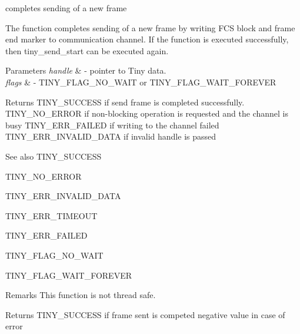 completes sending of a new frame 

The function completes sending of a new frame by writing F\+C\+S block and frame end marker to communication channel. If the function is executed successfully, then tiny\+\_\+send\+\_\+start can be executed again.


\begin{DoxyParams}{Parameters}
{\em handle} & -\/ pointer to Tiny data. \\
\hline
{\em flags} & -\/ T\+I\+N\+Y\+\_\+\+F\+L\+A\+G\+\_\+\+N\+O\+\_\+\+W\+A\+I\+T or T\+I\+N\+Y\+\_\+\+F\+L\+A\+G\+\_\+\+W\+A\+I\+T\+\_\+\+F\+O\+R\+E\+V\+E\+R \\
\hline
\end{DoxyParams}
\begin{DoxyReturn}{Returns}
T\+I\+N\+Y\+\_\+\+S\+U\+C\+C\+E\+S\+S if send frame is completed successfully. T\+I\+N\+Y\+\_\+\+N\+O\+\_\+\+E\+R\+R\+O\+R if non-\/blocking operation is requested and the channel is busy T\+I\+N\+Y\+\_\+\+E\+R\+R\+\_\+\+F\+A\+I\+L\+E\+D if writing to the channel failed T\+I\+N\+Y\+\_\+\+E\+R\+R\+\_\+\+I\+N\+V\+A\+L\+I\+D\+\_\+\+D\+A\+T\+A if invalid handle is passed
\end{DoxyReturn}
\begin{DoxySeeAlso}{See also}
T\+I\+N\+Y\+\_\+\+S\+U\+C\+C\+E\+S\+S 

T\+I\+N\+Y\+\_\+\+N\+O\+\_\+\+E\+R\+R\+O\+R 

T\+I\+N\+Y\+\_\+\+E\+R\+R\+\_\+\+I\+N\+V\+A\+L\+I\+D\+\_\+\+D\+A\+T\+A 

T\+I\+N\+Y\+\_\+\+E\+R\+R\+\_\+\+T\+I\+M\+E\+O\+U\+T 

T\+I\+N\+Y\+\_\+\+E\+R\+R\+\_\+\+F\+A\+I\+L\+E\+D 

T\+I\+N\+Y\+\_\+\+F\+L\+A\+G\+\_\+\+N\+O\+\_\+\+W\+A\+I\+T 

T\+I\+N\+Y\+\_\+\+F\+L\+A\+G\+\_\+\+W\+A\+I\+T\+\_\+\+F\+O\+R\+E\+V\+E\+R 
\end{DoxySeeAlso}
\begin{DoxyRemark}{Remarks}
This function is not thread safe.
\end{DoxyRemark}
Returns T\+I\+N\+Y\+\_\+\+S\+U\+C\+C\+E\+S\+S if frame sent is competed negative value in case of error \hypertarget{group__ADVANCED__API_ga159189fa29f3eaa79a76a3fa87b31084}{}
